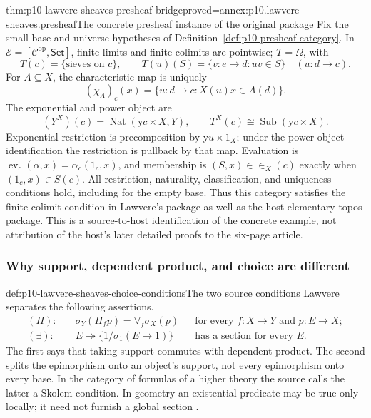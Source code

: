 \begin{hbtheorem}{thm:p10-lawvere-sheaves-presheaf-bridge}{proved=annex:p10.lawvere-sheaves.presheaf}{The concrete presheaf instance of the original package}
Fix the small-base and universe hypotheses of
Definition~\ref{def:p10-presheaf-category}.  In
\(\mathcal E=[\mathcal C^{\mathrm{op}},\mathsf{Set}]\), finite limits
and finite colimits are pointwise; \(T=\Omega\), with
\[
 T(c)=\{\text{sieves on }c\},\qquad
 T(u)(S)=\{v:e\to d:u v\in S\}\quad(u:d\to c).
\]
For \(A\subseteq X\), the characteristic map is uniquely
\[
 (\chi_A)_c(x)=\{u:d\to c:X(u)x\in A(d)\}.
\]
The exponential and power object are
\[
 (Y^X)(c)=\operatorname{Nat}(\mathrm y c\times X,Y),\qquad
 T^X(c)\cong\operatorname{Sub}(\mathrm y c\times X).
\]
Exponential restriction is precomposition by
\(\mathrm y u\times1_X\); under the power-object identification
the restriction is pullback by that map.  Evaluation is
\(\operatorname{ev}_c(\alpha,x)=\alpha_c(1_c,x)\), and membership
is \((S,x)\in\in_X(c)\) exactly when \((1_c,x)\in S(c)\).
All restriction, naturality, classification, and uniqueness conditions
hold, including for the empty base.  Thus this category satisfies the
finite-colimit condition in Lawvere's package as well as the host
elementary-topos package.  This is a source-to-host identification of
the concrete example, not attribution of the host's later detailed
proofs to the six-page article.
\end{hbtheorem}

\subsubsection{Why support, dependent product, and choice are different}

\begin{hbdefinition}{def:p10-lawvere-sheaves-choice-conditions}{The two source conditions}
Lawvere separates the following assertions.
\[
\begin{aligned}
(\Pi):\quad&
 \sigma_Y(\Pi_f p)=\forall_f\sigma_X(p)
 &&\text{for every }f:X\to Y\text{ and }p:E\to X;\\
(\exists):\quad&
 E\twoheadrightarrow\{1/\sigma_1(E\to1)\}
 &&\text{has a section for every }E.
\end{aligned}
\]
The first says that taking support commutes with dependent product.
The second splits the epimorphism onto an object's support, not every
epimorphism onto every base.  In the category of formulas of a higher
theory the source calls the latter a Skolem condition.  In geometry an
existential predicate may be true only locally; it need not furnish a
global section \cite[pp.~330--331]{Lawvere1970}.
\end{hbdefinition}

